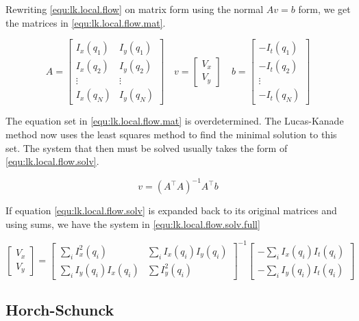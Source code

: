 Rewriting \eqref{equ:lk.local.flow} on matrix form using the normal $Av = b$ form, we get the matrices in \eqref{equ:lk.local.flow.mat}.

\begin{equation} \label{equ:lk.local.flow.mat}
A = 
\begin{bmatrix}
	I_x(q_1) 	& I_y(q_1) \\
	I_x(q_2) 	& I_y(q_2) \\ 
	\vdots 		& \vdots \\
	I_x(q_N)	& I_y(q_N)
\end{bmatrix} \quad 
v = 
\begin{bmatrix}
V_x \\ V_y
\end{bmatrix} \quad
b = 
\begin{bmatrix}
-I_t(q_1) \\ -I_t(q_2) \\ \vdots \\ -I_t(q_N)
\end{bmatrix}
\end{equation}

The equation set in \eqref{equ:lk.local.flow.mat} is overdetermined. The Lucas-Kanade method now uses the 
least squares method to find the minimal solution to this set. The system that then must be solved usually takes the 
form of \eqref{equ:lk.local.flow.solv}.

\begin{equation}\label{equ:lk.local.flow.solv}
v = \left(A^\top A\right)^{-1} A^\top b
\end{equation}

If equation \eqref{equ:lk.local.flow.solv} is expanded back to its original matrices and using sums, we have the system in \eqref{equ:lk.local.flow.solv.full}

\begin{equation}\label{equ:lk.local.flow.solv.full}
\begin{bmatrix}
V_x \\ V_y
\end{bmatrix} = 
\begin{bmatrix}
\sum_ i{I_x^2(q_i)} 	 & \sum_i{I_x(q_i)I_y(q_i)} \\
\sum_i{I_y(q_i)I_x(q_i)} & \sum{I_y^2(q_i)}
\end{bmatrix}^{-1}
\begin{bmatrix}
-\sum_i{I_x(q_i)I_t(q_i)} \\ -\sum_i{I_y(q_i)I_t(q_i)}
\end{bmatrix}
\end{equation}

\subsection{Horch-Schunck}

